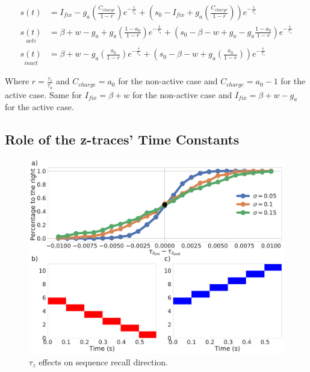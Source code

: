 \documentclass[10pt,a4paper]{article}
\begin{document}
\begin{align} 
s(t) &= I_{fix} - g_a\left(\frac{C_{charge}}{1 - r} \right) e^{-\frac{t}{\tau_a}} + \left(s_0 - I_{fix} + g_a \left( \frac{C_{charge}}{1 - r}\right)\right)e^{-\frac{t}{\tau_s}} \label{eq:deterministic_solution}\\
\underset{acti}{s(t)} &= \beta + w - g_a + g_a \left(\frac{1 - a_0}{1 - r}\right) e^{-\frac{t}{\tau_a}} + \left(s_0 - \beta - w + g_a - g_a \frac{1 - a_0}{1 - r}\right) e^{-\frac{t}{\tau_s}}  \\ 
\underset{inact}{s(t)} &= \beta + w - g_a \left( \frac{a_0}{1 - r} \right) e^{-\frac{t}{\tau_a}} + \left(s_0 - \beta  - w  + g_a \left( \frac{a_0}{1 - r} \right) \right) e^{-\frac{t}{\tau_s}} 
\end{align}

Where $r=\frac{\tau_s}{\tau_a}$ and $C_{charge}=a_0$ for the non-active case and $C_{charge} = a_0 - 1$ for the active case. Same for $I_{fix}=\beta + w$ for the non-active case and $I_{fix} = \beta + w - g_a$ for the active case. 

\subsection{Role of the z-traces' Time Constants}
\begin{figure}[H]
\centering
\includegraphics[scale=0.20]{asymmetry.pdf}
\caption{$\tau_z$ effects on sequence recall direction. }
\label{fig:z-assymetry}
\end{figure}
\end{document}
